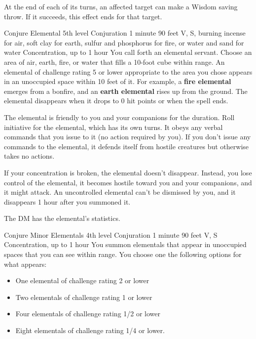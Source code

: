 \documentclass[10pt,a4paper,twoside,bg=print,twocolumn,openany,nodeprecatedcode]{dndbook}
\begin{document}
At the end of each of its turns, an affected target can make a Wisdom saving throw. If it succeeds, this effect ends for that target.



\DndSpellHeader%
{Conjure Elemental}
{5th level Conjuration}
{1 minute}
{90 feet}
{V, S, burning incense for air, soft clay for earth, sulfur and phosphorus for fire, or water and sand for water}
{Concentration, up to 1 hour}
You call forth an elemental servant. Choose an area of air, earth, fire, or water that fills a 10-foot cube within range. An elemental of challenge rating 5 or lower appropriate to the area you chose appears in an unoccupied space within 10 feet of it. For example, a \textbf{fire elemental} emerges from a bonfire, and an \textbf{earth elemental} rises up from the ground. The elemental disappears when it drops to 0 hit points or when the spell ends.

The elemental is friendly to you and your companions for the duration. Roll initiative for the elemental, which has its own turns. It obeys any verbal commands that you issue to it (no action required by you). If you don't issue any commands to the elemental, it defends itself from hostile creatures but otherwise takes no actions.

If your concentration is broken, the elemental doesn't disappear. Instead, you lose control of the elemental, it becomes hostile toward you and your companions, and it might attack. An uncontrolled elemental can't be dismissed by you, and it disappears 1 hour after you summoned it.

The DM has the elemental's statistics.



\DndSpellHeader%
{Conjure Minor Elementals}
{4th level Conjuration}
{1 minute}
{90 feet}
{V, S}
{Concentration, up to 1 hour}
You summon elementals that appear in unoccupied spaces that you can see within range. You choose one the following options for what appears:


\begin{itemize}
\item One elemental of challenge rating 2 or lower
\item Two elementals of challenge rating 1 or lower
\item Four elementals of challenge rating 1/2 or lower
\item Eight elementals of challenge rating 1/4 or lower.
\end{itemize}
\end{document}

